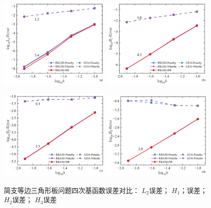 \begin{figure}[H]
    \centering
    \begin{subcaptiongroup}
    \includegraphics[width=0.49\textwidth]{figure/PHR/T/QL2.png}
    \label{QL2}
    \includegraphics[width=0.49\textwidth]{figure/PHR/T/QH1.png}
    \label{QH1}
    \end{subcaptiongroup}
    \begin{subcaptiongroup}
    \includegraphics[width=0.49\textwidth]{figure/PHR/T/QH2.png}
    \label{QH2}
    \includegraphics[width=0.49\textwidth]{figure/PHR/T/QH3.png}
    \label{QH3}
    \end{subcaptiongroup}
\caption{简支等边三角形板问题四次基函数误差对比： $L_2$误差； $H_1$；误差；$H_2$误差； $H_3$误差}
\label{TQLH}
\end{figure}
